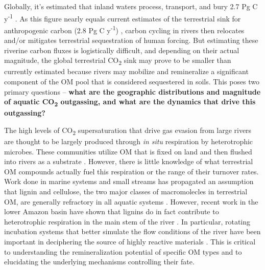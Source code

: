 \documentclass[12pt, letterpaper, twoside]{article}
\begin{document}
Globally, it's estimated that inland waters process, transport, and bury 2.7 Pg C y\textsuperscript{-1} \cite{battin_boundless_2009, tranvik_lakes_2009}. As this figure nearly equals current estimates of the terrestrial sink for anthropogenic carbon (2.8 Pg C y\textsuperscript{-1}) \cite{canadell_contributions_2007}, carbon cycling in rivers then relocates and/or mitigates terrestrial sequestration of human forcing. But estimating these riverine carbon fluxes is logistically difficult, and depending on their actual magnitude, the global terrestrial CO\textsubscript{2} sink may prove to be smaller than currently estimated because rivers may mobilize and remineralize a significant component of the OM pool that is considered sequestered in soils. This poses two primary questions – \textbf{what are the geographic distributions and magnitude of aquatic CO\textsubscript{2} outgassing, and what are the dynamics that drive this outgassing?} 

The high levels of CO\textsubscript{2} supersaturation that drive gas evasion from large rivers are thought to be largely produced through \textit{in situ} respiration by heterotrophic microbes. These communities utilize OM that is fixed on land and then flushed into rivers as a substrate \cite{mayorga_young_2005, ward_degradation_2013, ward_reactivity_2016}. However, there is little knowledge of what terrestrial OM compounds actually fuel this respiration or the range of their turnover rates. Work done in marine systems and small streams has propagated an assumption that lignin and cellulose, the two major classes of macromolecles in terrestrial OM, are generally refractory in all aquatic systems \cite{hedges_fluxes_1988, gough_terrestrial_1993, opsahl_distribution_1997}. However, recent work in the lower Amazon basin have shown that lignins do in fact contribute to heterotrophic respiration in the main stem of the river \cite{ward_degradation_2013}. In particular, rotating incubation systems that better simulate the flow conditions of the river have been important in deciphering the source of highly reactive materials \cite{ward_marine_2018}. This is critical to understanding the remineralization potential of specific OM types and to elucidating the underlying mechanisms controlling their fate. 
\end{document}
